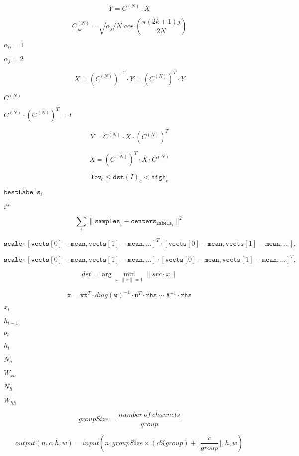 \documentclass{article}
\begin{document}
\[Y = C^{(N)} \cdot X\]
\pagebreak

\[C^{(N)}_{jk}= \sqrt{\alpha_j/N} \cos \left ( \frac{\pi(2k+1)j}{2N} \right )\]
\pagebreak

$\alpha_0=1$
\pagebreak

$\alpha_j=2$
\pagebreak

\[X = \left (C^{(N)} \right )^{-1} \cdot Y = \left (C^{(N)} \right )^T \cdot Y\]
\pagebreak

$C^{(N)}$
\pagebreak

$C^{(N)} \cdot \left(C^{(N)}\right)^T = I$
\pagebreak

\[Y = C^{(N)} \cdot X \cdot \left (C^{(N)} \right )^T\]
\pagebreak

\[X = \left (C^{(N)} \right )^T \cdot X \cdot C^{(N)}\]
\pagebreak

\[\texttt{low} _c \leq \texttt{dst} (I)_c < \texttt{high} _c\]
\pagebreak

$\texttt{bestLabels}_i$
\pagebreak

$i^{th}$
\pagebreak

\[\sum _i \| \texttt{samples} _i - \texttt{centers} _{ \texttt{labels} _i} \| ^2\]
\pagebreak

\[\texttt{scale} \cdot [ \texttt{vects} [0]- \texttt{mean} , \texttt{vects} [1]- \texttt{mean} ,...]^T \cdot [ \texttt{vects} [0]- \texttt{mean} , \texttt{vects} [1]- \texttt{mean} ,...],\]
\pagebreak

\[\texttt{scale} \cdot [ \texttt{vects} [0]- \texttt{mean} , \texttt{vects} [1]- \texttt{mean} ,...] \cdot [ \texttt{vects} [0]- \texttt{mean} , \texttt{vects} [1]- \texttt{mean} ,...]^T,\]
\pagebreak

\[dst = \arg \min _{x: \| x \| =1} \| src \cdot x \|\]
\pagebreak

\[\texttt{x} = \texttt{vt} ^T \cdot diag( \texttt{w} )^{-1} \cdot \texttt{u} ^T \cdot \texttt{rhs} \sim \texttt{A} ^{-1} \cdot \texttt{rhs}\]
\pagebreak

$x_t$
\pagebreak

$h_{t-1}$
\pagebreak

$o_t$
\pagebreak

$h_t$
\pagebreak

$N_o$
\pagebreak

$ W_{xo} $
\pagebreak

$N_h$
\pagebreak

$ W_{hh} $
\pagebreak

\[ groupSize = \frac{number\ of\ channels}{group} \]
\pagebreak

\[ output(n, c, h, w) = input(n, groupSize \times (c \% group) + \lfloor \frac{c}{group} \rfloor, h, w) \]
\pagebreak
\end{document}

